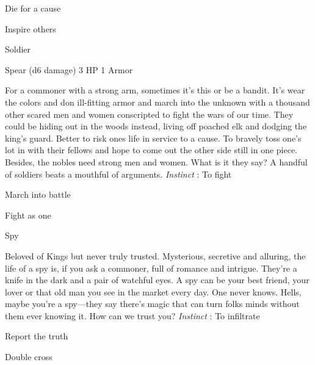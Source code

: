 \startitemize[1,packed]

\item Die for a cause

 
\item Inspire others


\stopitemize
 
\startMonsterName
Soldier	 
\stopMonsterName
 

Spear (d6 damage)	3 HP	1 Armor

 


 
\startMonsterDescription
For a commoner with a strong arm, sometimes it’s this or be a bandit. It’s wear the colors and don ill-fitting armor and march into the unknown with a thousand other scared men and women conscripted to fight the wars of our time. They could be hiding out in the woods instead, living off poached elk and dodging the king’s guard. Better to risk ones life in service to a cause. To bravely toss one’s lot in with their fellows and hope to come out the other side still in one piece. Besides, the nobles need strong men and women. What is it they say? A handful of soldiers beats a mouthful of arguments. {\em Instinct} : To fight
\stopMonsterDescription
 
\startitemize[1,packed]

\item March into battle

 
\item Fight as one


\stopitemize
 
\startMonsterName
Spy	
\stopMonsterName
 
\startMonsterDescription
Beloved of Kings but never truly trusted. Mysterious, secretive and alluring, the life of a spy is, if you ask a commoner, full of romance and intrigue. They’re a knife in the dark and a pair of watchful eyes. A spy can be your best friend, your lover or that old man you see in the market every day. One never knows. Hells, maybe you’re a spy—they say there’s magic that can turn folks minds without them ever knowing it. How can we trust you? {\em Instinct} : To infiltrate
\stopMonsterDescription
 
\startitemize[1,packed]

\item Report the truth

 
\item Double cross


